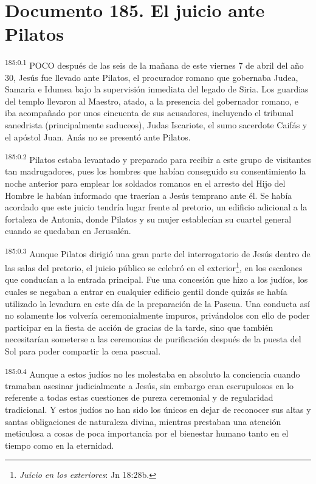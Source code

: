 \chapter{Documento 185. El juicio ante Pilatos}
\par
\textsuperscript{185:0.1} POCO después de las seis de la mañana de este viernes 7 de abril del año 30, Jesús fue llevado ante Pilatos, el procurador romano que gobernaba Judea, Samaria e Idumea bajo la supervisión inmediata del legado de Siria. Los guardias del templo llevaron al Maestro, atado, a la presencia del gobernador romano, e iba acompañado por unos cincuenta de sus acusadores, incluyendo el tribunal sanedrista (principalmente saduceos), Judas Iscariote, el sumo sacerdote Caifás y el apóstol Juan. Anás no se presentó ante Pilatos.

\par
\textsuperscript{185:0.2} Pilatos estaba levantado y preparado para recibir a este grupo de visitantes tan madrugadores, pues los hombres que habían conseguido su consentimiento la noche anterior para emplear los soldados romanos en el arresto del Hijo del Hombre le habían informado que traerían a Jesús temprano ante él. Se había acordado que este juicio tendría lugar frente al pretorio, un edificio adicional a la fortaleza de Antonia, donde Pilatos y su mujer establecían su cuartel general cuando se quedaban en Jerusalén.

\par
\textsuperscript{185:0.3} Aunque Pilatos dirigió una gran parte del interrogatorio de Jesús dentro de las salas del pretorio, el juicio público se celebró en el exterior\footnote{\textit{Juicio en los exteriores}: Jn 18:28b.}, en los escalones que conducían a la entrada principal. Fue una concesión que hizo a los judíos, los cuales se negaban a entrar en cualquier edificio gentil donde quizás se había utilizado la levadura en este día de la preparación de la Pascua. Una conducta así no solamente los volvería ceremonialmente impuros, privándolos con ello de poder participar en la fiesta de acción de gracias de la tarde, sino que también necesitarían someterse a las ceremonias de purificación después de la puesta del Sol para poder compartir la cena pascual.

\par
\textsuperscript{185:0.4} Aunque a estos judíos no les molestaba en absoluto la conciencia cuando tramaban asesinar judicialmente a Jesús, sin embargo eran escrupulosos en lo referente a todas estas cuestiones de pureza ceremonial y de regularidad tradicional. Y estos judíos no han sido los únicos en dejar de reconocer sus altas y santas obligaciones de naturaleza divina, mientras prestaban una atención meticulosa a cosas de poca importancia por el bienestar humano tanto en el tiempo como en la eternidad.

